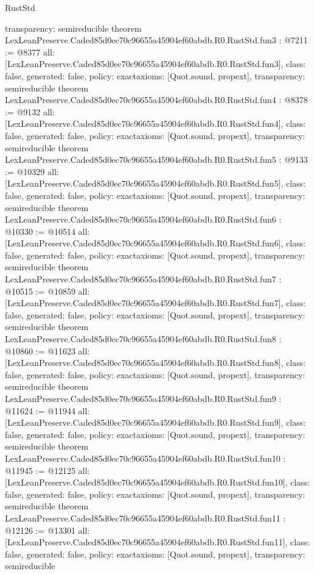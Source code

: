 \begin{lexlean}{RustStd}
\begin{coremodule}
{  transparency: semireducible
}
theorem LexLeanPreserve.Caded85d0ec70c96655a45904ef60abdb.R0.RustStd.fun3 : @7211 := @8377 {
  all: [LexLeanPreserve.Caded85d0ec70c96655a45904ef60abdb.R0.RustStd.fun3],
  class: false,
  generated: false,
  policy: exact{axioms: [Quot.sound, propext]},
  transparency: semireducible
}
theorem LexLeanPreserve.Caded85d0ec70c96655a45904ef60abdb.R0.RustStd.fun4 : @8378 := @9132 {
  all: [LexLeanPreserve.Caded85d0ec70c96655a45904ef60abdb.R0.RustStd.fun4],
  class: false,
  generated: false,
  policy: exact{axioms: [Quot.sound, propext]},
  transparency: semireducible
}
theorem LexLeanPreserve.Caded85d0ec70c96655a45904ef60abdb.R0.RustStd.fun5 : @9133 := @10329 {
  all: [LexLeanPreserve.Caded85d0ec70c96655a45904ef60abdb.R0.RustStd.fun5],
  class: false,
  generated: false,
  policy: exact{axioms: [Quot.sound, propext]},
  transparency: semireducible
}
theorem LexLeanPreserve.Caded85d0ec70c96655a45904ef60abdb.R0.RustStd.fun6 : @10330 := @10514 {
  all: [LexLeanPreserve.Caded85d0ec70c96655a45904ef60abdb.R0.RustStd.fun6],
  class: false,
  generated: false,
  policy: exact{axioms: [Quot.sound, propext]},
  transparency: semireducible
}
theorem LexLeanPreserve.Caded85d0ec70c96655a45904ef60abdb.R0.RustStd.fun7 : @10515 := @10859 {
  all: [LexLeanPreserve.Caded85d0ec70c96655a45904ef60abdb.R0.RustStd.fun7],
  class: false,
  generated: false,
  policy: exact{axioms: [Quot.sound, propext]},
  transparency: semireducible
}
theorem LexLeanPreserve.Caded85d0ec70c96655a45904ef60abdb.R0.RustStd.fun8 : @10860 := @11623 {
  all: [LexLeanPreserve.Caded85d0ec70c96655a45904ef60abdb.R0.RustStd.fun8],
  class: false,
  generated: false,
  policy: exact{axioms: [Quot.sound, propext]},
  transparency: semireducible
}
theorem LexLeanPreserve.Caded85d0ec70c96655a45904ef60abdb.R0.RustStd.fun9 : @11624 := @11944 {
  all: [LexLeanPreserve.Caded85d0ec70c96655a45904ef60abdb.R0.RustStd.fun9],
  class: false,
  generated: false,
  policy: exact{axioms: [Quot.sound, propext]},
  transparency: semireducible
}
theorem LexLeanPreserve.Caded85d0ec70c96655a45904ef60abdb.R0.RustStd.fun10 : @11945 := @12125 {
  all: [LexLeanPreserve.Caded85d0ec70c96655a45904ef60abdb.R0.RustStd.fun10],
  class: false,
  generated: false,
  policy: exact{axioms: [Quot.sound, propext]},
  transparency: semireducible
}
theorem LexLeanPreserve.Caded85d0ec70c96655a45904ef60abdb.R0.RustStd.fun11 : @12126 := @13301 {
  all: [LexLeanPreserve.Caded85d0ec70c96655a45904ef60abdb.R0.RustStd.fun11],
  class: false,
  generated: false,
  policy: exact{axioms: [Quot.sound, propext]},
  transparency: semireducible
}
\end{coremodule}
\end{lexlean}

